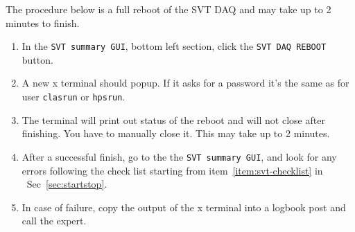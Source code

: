 \documentclass[12pt]{article}
\begin{document}
The procedure below is a full reboot of the SVT DAQ and may take up to 2 minutes to finish. 

\begin{enumerate}

\item
In the \texttt{SVT summary GUI}, bottom left section, click the \texttt{SVT DAQ REBOOT} button.

\item
A new x terminal should popup. If it asks for a password it's the same as for user \texttt{clasrun} or \texttt{hpsrun}.

\item
The terminal will print out status of the reboot and will not close after finishing. You have to manually close it. \newline
This may take up to 2 minutes.

\item 
After a successful finish, go to the the \texttt{SVT summary GUI}, and look for any errors following the check list starting from item~\ref{item:svt-checklist} in ~Sec~\ref{sec:startstop}.

\item
In case of failure, copy the output of the x terminal into a logbook post and call the expert.



\end{enumerate}
\end{document}
